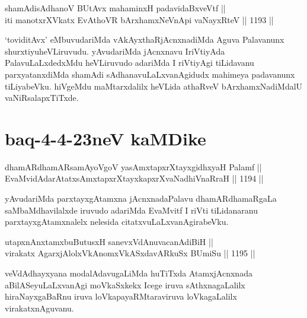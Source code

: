 \begin{shl}
shamAdisAdhanoV BUtAvx mahaminxH padavidaBxveVtf ||  \\
iti manotxrXVkatx EvAthoVR bArxhamxNeVnApi vaNayxRteV ||  1193 ||  
\end{shl}


\begin{artha}
`toviditAvx' eMbuvudariMda vAkAyxthaRjAcnxnadiMda Aguva Palavanunx shurxtiyuheVLiruvudu. yAvudariMda jAcnxnavu IriVtiyAda PalavuLaLxdedxMdu heVLiruvudo adariMda I riVtiyAgi tiLidavanu parxyatanxdiMda shamAdi sAdhanavuLaLxvanAgidudx mahimeya padavanunx tiLiyabeVku. hiVgeMdu maMtarxdalilx heVLida athaRveV bArxhamxNadiMdalU vaNiRsalapxTiTxde.
\end{artha}

\section*{baq-4-4-23neV kaMDike}


\begin{shl}
dhamARdhamARsamAyoVgoV yasAmxtapxrXtayxgidhxyaH Palamf ||  \\
EvaMvidAdarAtatxsAmxtapxrXtayxkapxrXvaNadhiVnaRraH ||  1194 ||  
\end{shl}

\begin{artha}
yAvudariMda parxtayxgAtamxna jAcnxnadaPalavu dhamARdhamaRgaLa saMbaMdhavilalxde iruvudo adariMda EvaMvitf I riVti tiLidanaranu parxtayxgAtamxnalelx nelesida citatxvuLaLxvanAgirabeVku.
\end{artha}

\begin{shl}
utapxnAnxtamxbuButusxH sanevxVdAnuvacanAdiBiH || \\
virakatx AgarxjAlolxVkAnomxVkASxdavARkuSx BUmiSu ||  1195 || 
\end{shl}

\begin{artha}
veVdAdhayxyana modalAdavugaLiMda huTiTxda AtamxjAcnxnada aBilASeyuLaLxvanAgi moVkaSxkekx Icege iruva sAthxnagaLalilx hiraNayxgaBaRnu iruva loVkapayaRMtaraviruva loVkagaLalilx virakatxnAguvanu.
\end{artha}


